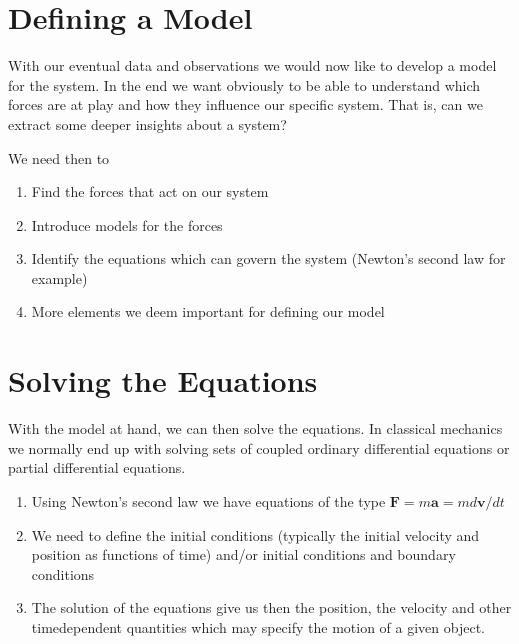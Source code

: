 \documentclass[letterpaper,10pt,english]{sphinxmanual}
\begin{document}
\section{Defining a Model}
\label{\detokenize{chapter1:defining-a-model}}
With our eventual data and observations we would now like to develop a
model for the system. In the end we want obviously to be able to
understand which forces are at play and how they influence our
specific system. That is, can we extract some deeper insights about a
system?

We need then to
\begin{enumerate}
%
\item {} 
Find the forces that act on our system

\item {} 
Introduce models for the forces

\item {} 
Identify the equations which can govern the system (Newton’s second law for example)

\item {} 
More elements we deem important for defining our model

\end{enumerate}


\section{Solving the Equations}
\label{\detokenize{chapter1:solving-the-equations}}
With the model at hand, we can then solve the equations. In classical mechanics we normally end up  with solving sets of coupled ordinary differential equations or partial differential equations.
\begin{enumerate}
%
\item {} 
Using Newton’s second law we have equations of the type \(\boldsymbol{F}=m\boldsymbol{a}=md\boldsymbol{v}/dt\)

\item {} 
We need to  define the initial conditions (typically the initial velocity and position as functions of time) and/or initial conditions and boundary conditions

\item {} 
The solution of the equations give us then the position, the velocity and other time\sphinxhyphen{}dependent quantities which may specify the motion of a given object.

\end{enumerate}
\end{document}
